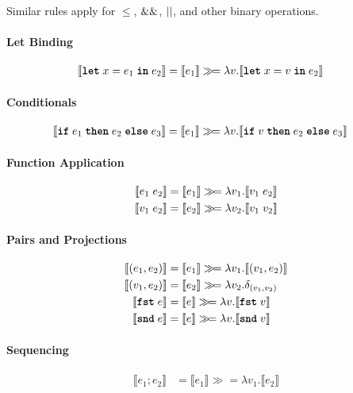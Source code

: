 Similar rules apply for $\leq$, $\mathrel{\&\&}$, $\mathrel{||}$, and other binary operations.

\paragraph{Let Binding}
\begin{align*}
\llbracket  \text{\ttfamily\bfseries let} \; x = e_1 \; \text{\ttfamily\bfseries in} \; e_2  \rrbracket &= \llbracket e_1 \rrbracket \gg\!= \lambda v. \llbracket \text{\ttfamily\bfseries let} \; x = v \; \text{\ttfamily\bfseries in} \; e_2 \rrbracket
\end{align*}

\paragraph{Conditionals}
\begin{align*}
\llbracket  \text{\ttfamily\bfseries if} \; e_1 \; \text{\ttfamily\bfseries then} \; e_2 \; \text{\ttfamily\bfseries else} \; e_3  \rrbracket &= \llbracket e_1 \rrbracket \gg\!= \lambda v. \llbracket \text{\ttfamily\bfseries if} \; v \; \text{\ttfamily\bfseries then} \; e_2 \; \text{\ttfamily\bfseries else} \; e_3 \rrbracket
\end{align*}

\paragraph{Function Application}
\begin{align*}
\llbracket  e_1 \; e_2  \rrbracket &= \llbracket e_1 \rrbracket \gg\!= \lambda v_1. \llbracket v_1 \; e_2 \rrbracket \\
\llbracket  v_1 \; e_2  \rrbracket &= \llbracket e_2 \rrbracket \gg\!= \lambda v_2. \llbracket v_1 \; v_2 \rrbracket
\end{align*}

\paragraph{Pairs and Projections}
\begin{align*}
\llbracket  (e_1, e_2)  \rrbracket &= \llbracket e_1 \rrbracket \gg\!= \lambda v_1. \llbracket (v_1, e_2) \rrbracket \\
\llbracket  (v_1, e_2)  \rrbracket &= \llbracket e_2 \rrbracket \gg\!= \lambda v_2. \delta_{(v_1, v_2)} \\
\llbracket  \text{\ttfamily\bfseries fst} \; e  \rrbracket &= \llbracket e \rrbracket \gg\!= \lambda v. \llbracket \text{\ttfamily\bfseries fst} \; v \rrbracket \\
\llbracket  \text{\ttfamily\bfseries snd} \; e  \rrbracket &= \llbracket e \rrbracket \gg\!= \lambda v. \llbracket \text{\ttfamily\bfseries snd} \; v \rrbracket
\end{align*}

\paragraph{Sequencing}
\begin{align*}
\llbracket e_1; e_2 \rrbracket &= \llbracket e_1 \rrbracket \gg\!= \lambda v_1. \llbracket e_2 \rrbracket
\end{align*}

